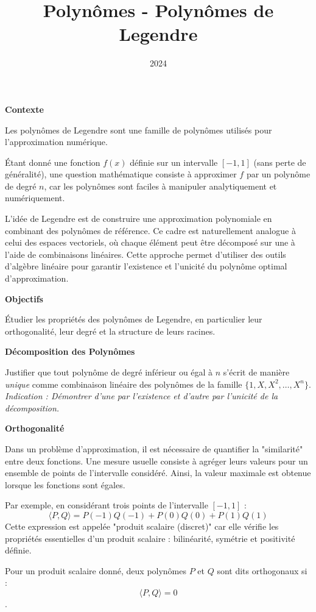 \documentclass[10pt,a4paper]{article}
\title{Polynômes - Polynômes de Legendre}
\author{}
\date{2024}
\begin{document}

\bigskip
\textbf{Contexte}

Les polynômes de Legendre sont une famille de polynômes utilisés pour l'approximation numérique.

Étant donné une fonction $f(x)$ définie sur un intervalle $[-1,1]$ (sans perte de généralité), une
question mathématique consiste à approximer $f$ par un polynôme de degré $n$, car les polynômes sont
faciles à manipuler analytiquement et numériquement.

L'idée de Legendre est de construire une approximation polynomiale en combinant des polynômes de
référence. Ce cadre est naturellement analogue à celui des espaces vectoriels, où chaque élément
peut être décomposé sur une à l'aide de combinaisons linéaires. Cette approche permet
d'utiliser des outils d'algèbre linéaire pour garantir l'existence et l'unicité du polynôme optimal
d'approximation.


\bigskip
\textbf{Objectifs}

Étudier les propriétés des polynômes de Legendre, en particulier leur orthogonalité, leur degré et
la structure de leurs racines.

\bigskip
\textbf{Décomposition des Polynômes}

\q Justifier que tout polynôme de degré inférieur ou égal à $n$ s'écrit de manière \textit{unique}
comme combinaison linéaire des polynômes de la famille $\{1, X, X^2, \dots, X^n\}$.
\textit{Indication : Démontrer d'une par l'existence et d'autre par l'unicité de la décomposition.}

\bigskip
\textbf{Orthogonalité}

Dans un problème d'approximation, il est nécessaire de quantifier la "similarité" entre deux
fonctions. Une mesure usuelle consiste à agréger leurs valeurs pour un ensemble de points de
l'intervalle considéré. Ainsi, la valeur maximale est obtenue lorsque les fonctions sont égales.

Par exemple, en considérant trois points de l'intervalle $[-1,1]$ :
\[
\langle P, Q \rangle = P(-1)Q(-1) + P(0)Q(0) + P(1)Q(1)
\]
Cette expression est appelée "produit scalaire (discret)" car elle vérifie les propriétés
essentielles d'un produit scalaire : bilinéarité, symétrie et positivité définie.

Pour un produit scalaire donné, deux polynômes $P$ et $Q$ sont dits orthogonaux si :
$$\langle P, Q \rangle = 0$$.
\end{document}
